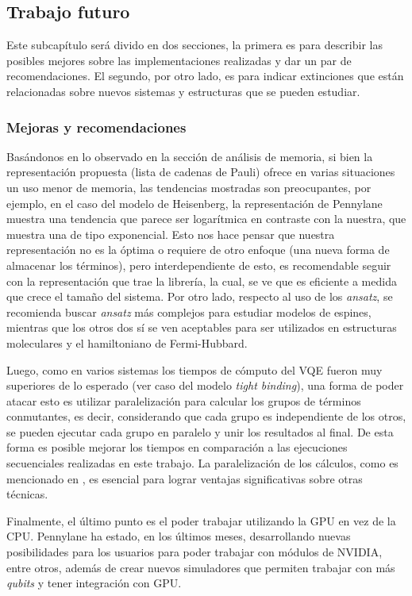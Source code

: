 %
%
%
%
%
\subsection{Trabajo futuro}
Este subcapítulo será divido en dos secciones, la primera es para describir las posibles mejores sobre las implementaciones realizadas y dar un par de recomendaciones. El segundo, por otro lado, es para indicar extinciones que están relacionadas sobre nuevos sistemas y estructuras que se pueden estudiar.

\subsubsection{Mejoras y recomendaciones}
Basándonos en lo observado en la sección de análisis de memoria, si bien la representación propuesta (lista de cadenas de Pauli) ofrece en varias situaciones un uso menor de memoria, las tendencias mostradas son preocupantes, por ejemplo, en el caso del modelo de Heisenberg, la representación de Pennylane muestra una tendencia que parece ser logarítmica en contraste con la nuestra, que muestra una de tipo exponencial. Esto nos hace pensar que nuestra representación no es la óptima o requiere de otro enfoque (una nueva forma de almacenar los términos), pero interdependiente de esto, es recomendable seguir con la representación que trae la librería, la cual, se ve que es eficiente a medida que crece el tamaño del sistema. Por otro lado, respecto al uso de los \textit{ansatz}, se recomienda buscar \textit{ansatz} más complejos para estudiar modelos de espines, mientras que los otros dos sí se ven aceptables para ser utilizados en estructuras moleculares y el hamiltoniano de Fermi-Hubbard.

Luego, como en varios sistemas los tiempos de cómputo del VQE fueron muy superiores de lo esperado (ver caso del modelo \textit{tight binding}), una forma de poder atacar esto es utilizar paralelización para calcular los grupos de términos conmutantes, es decir, considerando que cada grupo es independiente de los otros, se pueden ejecutar cada grupo en paralelo y unir los resultados al final. De esta forma es posible mejorar los tiempos en comparación a las ejecuciones secuenciales realizadas en este trabajo. La paralelización de los cálculos, como es mencionado en \cite{VQEReview}, es esencial para lograr ventajas significativas sobre otras técnicas.

Finalmente, el último punto es el poder trabajar utilizando la GPU en vez de la CPU. Pennylane ha estado, en los últimos meses, desarrollando nuevas posibilidades para los usuarios para poder trabajar con módulos de NVIDIA, entre otros, además de crear nuevos simuladores que permiten trabajar con más \textit{qubits} y tener integración con GPU.

